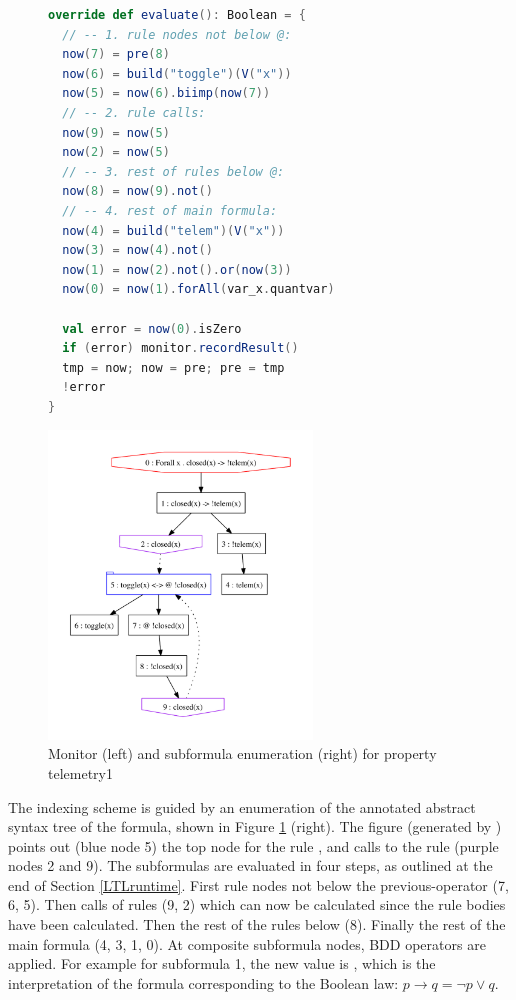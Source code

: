 \begin{figure}[htb]
\centering
\begin{minipage}[b]{.51\textwidth}
\begin{lstlisting}[language=scala,basicstyle=\sffamily]
override def evaluate(): Boolean = {
  // -- 1. rule nodes not below @:
  now(7) = pre(8)
  now(6) = build("toggle")(V("x"))
  now(5) = now(6).biimp(now(7))
  // -- 2. rule calls:
  now(9) = now(5)
  now(2) = now(5)
  // -- 3. rest of rules below @:
  now(8) = now(9).not()
  // -- 4. rest of main formula:
  now(4) = build("telem")(V("x"))
  now(3) = now(4).not()
  now(1) = now(2).not().or(now(3))
  now(0) = now(1).forAll(var_x.quantvar)

  val error = now(0).isZero
  if (error) monitor.recordResult()
  tmp = now; now = pre; pre = tmp
  !error
}
\end{lstlisting}
\end{minipage}
\qquad
\begin{minipage}[b]{.43\textwidth}
\includegraphics[width=7cm]{figures/ast.pdf}
\end{minipage}
\caption{Monitor (left) and subformula enumeration (right) for property telemetry1}
\label{fig:monitor}
\end{figure}

The indexing scheme is guided by an enumeration of the annotated abstract syntax tree of the formula, shown in Figure \ref{fig:monitor} (right). The figure (generated by \dejavu) points out (blue node 5) the top node for the rule , and calls to the rule (purple nodes 2 and 9).
The subformulas are evaluated in four steps, as outlined at the end of Section \ref{LTLruntime}. First rule nodes not below the previous-operator  (7, 6, 5). Then calls of rules (9, 2)
which can now be calculated since the rule bodies have been calculated. Then the rest of the rules below   (8). Finally the rest of the main formula (4, 3, 1, 0). At composite subformula nodes, BDD operators are applied. For example for subformula  1, the new  value is , 
which is the interpretation of the formula 
 corresponding to the Boolean law:
$p \rightarrow q = \neg p \vee q$.

